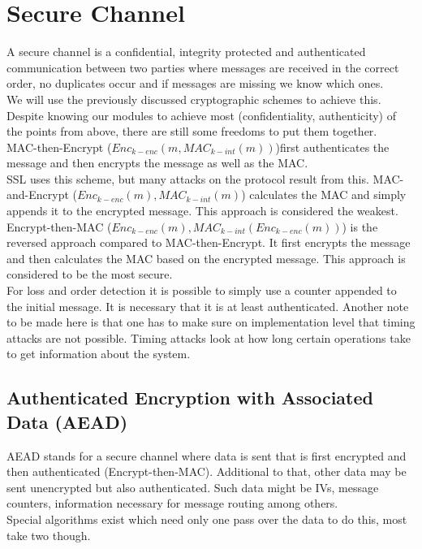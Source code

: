 
\section{Secure Channel}
A secure channel is a confidential, integrity protected and authenticated communication between two parties where messages are received in the correct order, no duplicates occur and if messages are missing we know which ones.\\

We will use the previously discussed cryptographic schemes to achieve this.
Despite knowing our modules to achieve most (confidentiality, authenticity) of the points from above, there are still some freedoms to put them together.\\
MAC-then-Encrypt ($Enc_{k-enc}(m,MAC_{k-int}(m))$)first authenticates the message and then encrypts the message as well as the MAC.\\
SSL uses this scheme, but many attacks on the protocol result from this.
MAC-and-Encrypt ($Enc_{k-enc}(m),MAC_{k-int}(m)$) calculates the MAC and simply appends it to the encrypted message.
This approach is considered the weakest.\\
Encrypt-then-MAC ($Enc_{k-enc}(m),MAC_{k-int}(Enc_{k-enc}(m))$) is the reversed approach compared to MAC-then-Encrypt.
It first encrypts the message and then calculates the MAC based on the encrypted message.
This approach is considered to be the most secure.\\
For loss and order detection it is possible to simply use a counter appended to the initial message.
It is necessary that it is at least authenticated.
Another note to be made here is that one has to make sure on implementation level that timing attacks are not possible.
Timing attacks look at how long certain operations take to get information about the system.

\subsection{Authenticated Encryption with Associated Data (AEAD)}
AEAD stands for a secure channel where data is sent that is first encrypted and then authenticated (Encrypt-then-MAC).
Additional to that, other data may be sent unencrypted but also authenticated.
Such data might be IVs, message counters, information necessary for message routing among others.\\
Special algorithms exist which need only one pass over the data to do this, most take two though.

